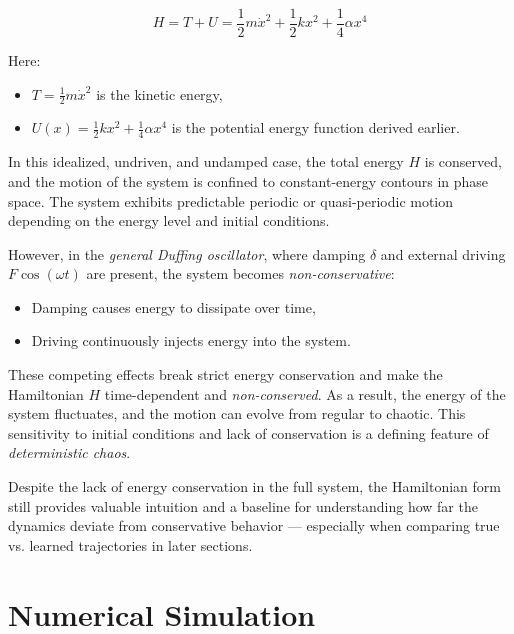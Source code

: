 \documentclass{article}
\begin{document}
\begin{equation}
    H = T + U = \frac{1}{2}m\dot{x}^2 + \frac{1}{2}kx^2 + \frac{1}{4}\alpha x^4
\end{equation}

Here:
\begin{itemize}
    \item $T = \frac{1}{2}m\dot{x}^2$ is the kinetic energy,
    \item $U(x) = \frac{1}{2}kx^2 + \frac{1}{4}\alpha x^4$ is the potential energy function derived earlier.
\end{itemize}

In this idealized, undriven, and undamped case, the total energy $H$ is conserved, and the motion of the system is confined to constant-energy contours in phase space. The system exhibits predictable periodic or quasi-periodic motion depending on the energy level and initial conditions.

However, in the \textit{general Duffing oscillator}, where damping $\delta$ and external driving $F \cos(\omega t)$ are present, the system becomes \textit{non-conservative}:
\begin{itemize}
    \item Damping causes energy to dissipate over time,
    \item Driving continuously injects energy into the system.
\end{itemize}

These competing effects break strict energy conservation and make the Hamiltonian $H$ time-dependent and \textit{non-conserved}. As a result, the energy of the system fluctuates, and the motion can evolve from regular to chaotic. This sensitivity to initial conditions and lack of conservation is a defining feature of \textit{deterministic chaos}.

Despite the lack of energy conservation in the full system, the Hamiltonian form still provides valuable intuition and a baseline for understanding how far the dynamics deviate from conservative behavior — especially when comparing true vs. learned trajectories in later sections.



\section{Numerical Simulation}
\end{document}
